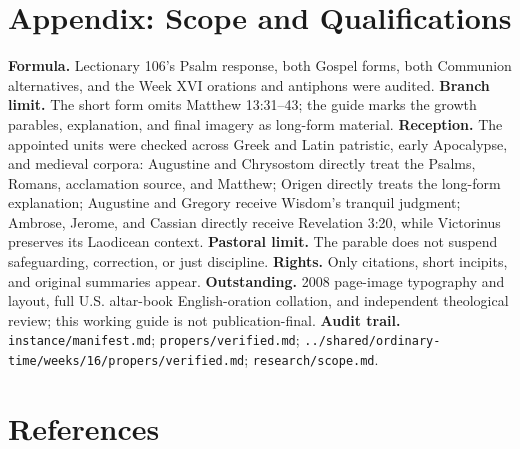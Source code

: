 \section*{Appendix: Scope and Qualifications}

\begin{studyframe}
\textbf{Formula.} Lectionary 106's Psalm response, both Gospel forms, both Communion alternatives, and the Week XVI orations and antiphons were audited. \textbf{Branch limit.} The short form omits Matthew 13:31--43; the guide marks the growth parables, explanation, and final imagery as long-form material. \textbf{Reception.} The appointed units were checked across Greek and Latin patristic, early Apocalypse, and medieval corpora: Augustine and Chrysostom directly treat the Psalms, Romans, acclamation source, and Matthew; Origen directly treats the long-form explanation; Augustine and Gregory receive Wisdom's tranquil judgment; Ambrose, Jerome, and Cassian directly receive Revelation 3:20, while Victorinus preserves its Laodicean context. \textbf{Pastoral limit.} The parable does not suspend safeguarding, correction, or just discipline. \textbf{Rights.} Only citations, short incipits, and original summaries appear. \textbf{Outstanding.} 2008 page-image typography and layout, full U.S. altar-book English-oration collation, and independent theological review; this working guide is not publication-final. \textbf{Audit trail.} \nolinkurl{instance/manifest.md}; \nolinkurl{propers/verified.md}; \nolinkurl{../shared/ordinary-time/weeks/16/propers/verified.md}; \nolinkurl{research/scope.md}.
\end{studyframe}

\section*{References}

